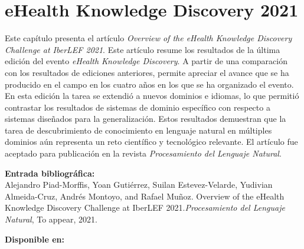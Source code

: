 
\chapter[eHealth Knowledge Discovery 2021: \textit{Overview of the eHealth Knowledge DiscoveryChallenge at IberLEF 2021}]{eHealth Knowledge Discovery 2021}
\label{Chap:eHealthKD21}

Este capítulo presenta el artículo \textit{Overview of the eHealth Knowledge Discovery Challenge at IberLEF 2021}.
Este artículo resume los resultados de la última edición del evento \textit{eHealth Knowledge Discovery}.
A partir de una comparación con los resultados de ediciones anteriores, permite apreciar el avance que se ha producido en el campo en los cuatro años en los que se ha organizado el evento.
En esta edición la tarea se extendió a nuevos dominios e idiomas, lo que permitió contrastar los resultados de sistemas de dominio específico con respecto a sistemas diseñados para la generalización.
Estos resultados demuestran que la tarea de descubrimiento de conocimiento en lenguaje natural en múltiples dominios aún representa un reto científico y tecnológico relevante.
El artículo fue aceptado para publicación en la revista \textit{Procesamiento del Lenguaje Natural}.

\BlankLine
\noindent \textbf{Entrada bibliográfica:}\\
Alejandro Piad-Morffis, Yoan Gutiérrez, Suilan Estevez-Velarde, Yudivian Almeida-Cruz, Andrés Montoyo, and Rafael Muñoz. Overview of the eHealth Knowledge Discovery Challenge at IberLEF 2021.\textit{Procesamiento del Lenguaje Natural}, To appear, 2021.

\BlankLine
\noindent \textbf{Disponible en:} \url{}
